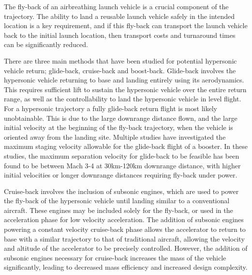 The fly-back of an airbreathing launch vehicle is a crucial component of the trajectory. The ability to land a reusable launch vehicle safely in the intended location is a key requirement, and if this fly-back can transport the launch vehicle back to the initial launch location, then transport costs and turnaround times can be significantly reduced. 

There are three main methods that have been studied for potential hypersonic vehicle return; glide-back, cruise-back and boost-back. Glide-back involves the hypersonic vehicle returning to base and landing entirely using its aerodynamics. This requires sufficient lift to sustain the hypersonic vehicle over the entire return range, as well as the controllability to land the hypersonic vehicle in level flight. 
For a hypersonic trajectory a fully glide-back return flight is most likely unobtainable. This is due to the large downrange distance flown, and the large initial velocity at the beginning of the fly-back trajectory, when the vehicle is oriented away from the landing site. Multiple studies have investigated the maximum staging velocity allowable for the glide-back flight of a booster. 
In these studies, the maximum separation velocity for glide-back to be feasible has been found to be between Mach 3-4 at 30km-120km downrange distance, with higher initial velocities or longer downrange distances requiring fly-back under power\cite{Hellman,Tetlow1992}.

Cruise-back involves the inclusion of subsonic engines, which are used to power the fly-back of the hypersonic vehicle until landing similar to a conventional aircraft. These engines may be included solely for the fly-back\cite{Hellman}, or used in the acceleration phase for low velocity acceleration\cite{Mehta2001,Tetlow1992,Wilhite1991}. The addition of subsonic engines powering a constant velocity cruise-back phase allows the accelerator to return to base with a similar trajectory to that of traditional aircraft, allowing the velocity and altitude of the accelerator to be precisely controlled. However, the addition of subsonic engines necessary for cruise-back increases the mass of the vehicle significantly, leading to decreased mass efficiency and increased design complexity\cite{Hellman}. 

